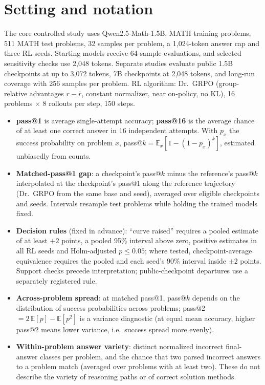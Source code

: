 \documentclass[11pt]{article}
\begin{document}
\section{Setting and notation}
The core controlled study uses Qwen2.5-Math-1.5B, MATH training problems, 511 MATH test problems, 32 samples per
problem, a 1,024-token answer cap and three RL seeds. Starting models receive 64-sample evaluations, and selected
sensitivity checks use 2,048 tokens. Separate studies evaluate public 1.5B checkpoints at up to 3,072 tokens, 7B
checkpoints at 2,048 tokens, and long-run coverage with 256 samples per problem. RL algorithm: Dr.~GRPO
(group-relative advantages $r-\bar r$, constant normalizer, near on-policy, no KL), 16 problems $\times$ 8 rollouts
per step, 150 steps.
\begin{itemize}
\item \textbf{pass@1} is average single-attempt accuracy; \textbf{pass@16} is the average chance of at least one
correct answer in 16 independent attempts. With $p_x$ the success probability on problem $x$,
pass@$k = \mathbb{E}_x[1-(1-p_x)^k]$, estimated unbiasedly from counts.
\item \textbf{Matched-pass@1 gap}: a checkpoint's pass@$k$ minus the reference's pass@$k$ interpolated at the
checkpoint's pass@1 along the reference trajectory (Dr.~GRPO from the same base and seed), averaged over eligible
checkpoints and seeds. Intervals resample test problems while holding the trained models fixed.
\item \textbf{Decision rules} (fixed in advance): ``curve raised'' requires a pooled estimate of at least $+2$
points, a pooled 95\% interval above zero, positive estimates in all RL seeds and Holm-adjusted $p\le0.05$; where
tested, checkpoint-average equivalence requires the pooled and each seed's 90\% interval inside $\pm2$ points.
Support checks precede interpretation; public-checkpoint departures use a separately registered rule.
\item \textbf{Across-problem spread}: at matched pass@1, pass@$k$ depends on the distribution of success
probabilities across problems; pass@2 $=2\,\mathbb{E}[p]-\mathbb{E}[p^2]$ is a variance diagnostic (at equal mean
accuracy, higher pass@2 means lower variance, i.e.\ success spread more evenly).
\item \textbf{Within-problem answer variety}: distinct normalized incorrect final-answer classes per problem, and the
chance that two parsed incorrect answers to a problem match (averaged over problems with at least two). These do not
describe the variety of reasoning paths or of correct solution methods.
\end{itemize}
\end{document}
